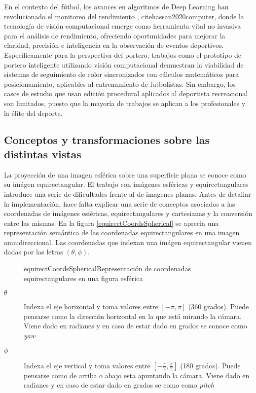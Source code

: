 En el contexto del fútbol, los avances en algoritmos de Deep Learning han revolucionado el monitoreo del rendimiento \cite{cioppa2020arthus}, cite{hassan2020computer}, donde la tecnología de visión computacional emerge como herramienta vital no invasiva para el análisis de rendimiento, ofreciendo oportunidades para mejorar la claridad, precisión e inteligencia en la observación de eventos deportivos. Específicamente para la perspectiva del portero, trabajos como el prototipo de portero inteligente \cite{prasetya2020} utilizando visión computacional demuestran la viabilidad de sistemas de seguimiento de color sincronizados con cálculos matemáticos para posicionamiento, aplicables al entrenamiento de futbolistas. Sin embargo, los casos de estudio que usan edición procedural aplicados al deportista recreacional son limitados, puesto que la mayoría de trabajos se aplican a los profesionales y la élite del deporte.

\subsection{Conceptos y transformaciones sobre las distintas vistas}
La proyección de una imagen esférica sobre una superficie plana se conoce como su imágen equirectangular. El trabajo con imágenes esféricas y equirectangulares introduce una serie de dificultades frente al de imagenes planas. Antes de detallar la implementación, hace falta explicar una serie de conceptos asociados a las coordenadas de imágenes esféricas, equirectangulares y cartesianas y la conversión entre las mismas. En la figura \ref{equirectCoordsSpherical} se aprecia una representación semántica de las coordenadas equirectangulares en una imagen omnidireccional. Las coordenadas que indexan una imágen equirectangular vienen dadas por las letras $(\theta, \phi)$.

\begin{figure}[Representación de sistemas de coordenadas en una esfera]{equirectCoordsSpherical}{Representación de coordenadas equirectangulares en una figura esférica \cite{Bussjaeger2025}}
	\begin{center}
	\end{center}
\end{figure}

\begin{description}
	\item[$\theta$] Indexa el eje horizontal y toma valores entre $[-\pi, \pi]$ (360 grados). Puede pensarse como la dirección horizontal en la que está mirando la cámara. Viene dado en radianes y en caso de estar dado en grados se conoce como \textit{yaw}
	\item[$\phi$] Indexa el eje vertical y toma valores entre $[-\frac{\pi}{2}, \frac{\pi}{2}]$ (180 grados). Puede pensarse como de arriba o abajo esta apuntando la cámara. Viene dado en radianes y en caso de estar dado en grados se como como \textit{pitch}
\end{description}

